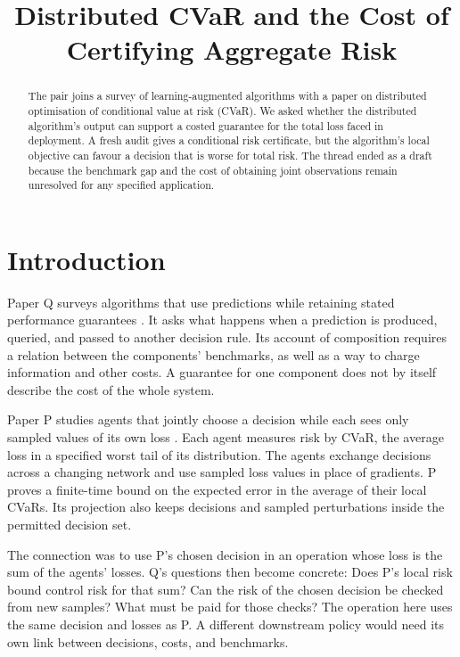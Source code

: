 \documentclass{article}
\title{Distributed CVaR and the Cost of Certifying Aggregate Risk}
\begin{document}
\maketitle

\begin{abstract}
The pair joins a survey of learning-augmented algorithms with a paper on distributed optimisation of
conditional value at risk (CVaR). We asked whether the distributed algorithm's output can support a costed
guarantee for the total loss faced in deployment. A fresh audit gives a conditional risk certificate, but the
algorithm's local objective can favour a decision that is worse for total risk. The thread ended as a draft
because the benchmark gap and the cost of obtaining joint observations remain unresolved for any specified
application.
\end{abstract}

\section{Introduction}

Paper Q surveys algorithms that use predictions while retaining stated performance guarantees \cite{Q}. It
asks what happens when a prediction is produced, queried, and passed to another decision rule. Its account of
composition requires a relation between the components' benchmarks, as well as a way to charge information and
other costs. A guarantee for one component does not by itself describe the cost of the whole system.

Paper P studies agents that jointly choose a decision while each sees only sampled values of its own loss
\cite{P}. Each agent measures risk by CVaR, the average loss in a specified worst tail of its distribution.
The agents exchange decisions across a changing network and use sampled loss values in place of gradients. P
proves a finite-time bound on the expected error in the average of their local CVaRs. Its projection also
keeps decisions and sampled perturbations inside the permitted decision set.

The connection was to use P's chosen decision in an operation whose loss is the sum of the agents' losses. Q's
questions then become concrete: Does P's local risk bound control risk for that sum? Can the risk of the
chosen decision be checked from new samples? What must be paid for those checks? The operation here uses the
same decision and losses as P. A different downstream policy would need its own link between decisions, costs,
and benchmarks.
\end{document}
